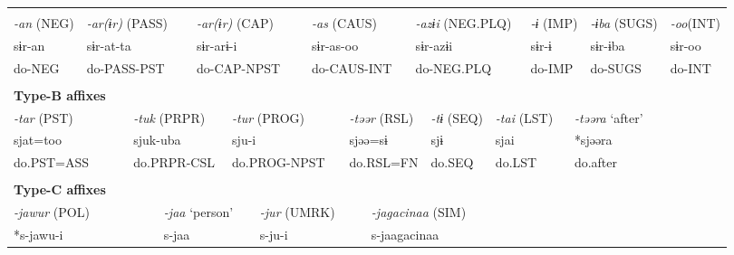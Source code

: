 \tabletail{}
\tablelasttail{}
\begin{tabularx}{\textwidth}{XXXXXXXXXXXXXXXXXXXXX}
\lsptoprule
\multicolumn{21}{X}{{\bfseries Type-A affixes}}\\
{ \textit{{}-an} (NEG)} & \multicolumn{4}{X}{{ \textit{{}-ar(ɨr)} (PASS)}} & \multicolumn{5}{X}{{ \textit{{}-ar(ɨr)} (CAP)}} & \multicolumn{4}{X}{{ \textit{{}-as} (CAUS)}} & \multicolumn{3}{X}{{ \textit{{}-azɨi} (NEG.PLQ)}} & \multicolumn{2}{X}{{ \textit{{}-ɨ} (IMP)}} & { \textit{{}-ɨba} (SUGS)} & { \textit{{}-oo}(INT)}\\
{ sɨr-an} & \multicolumn{4}{X}{{ sɨr-at-ta}} & \multicolumn{5}{X}{{ sɨr-arɨ-i}} & \multicolumn{4}{X}{{ sɨr-as-oo}} & \multicolumn{3}{X}{{ sɨr-azɨi}} & \multicolumn{2}{X}{{ sɨr-ɨ}} & { sɨr-ɨba} & { sɨr-oo}\\
do-NEG & \multicolumn{4}{X}{do-PASS-PST} & \multicolumn{5}{X}{do-CAP-NPST} & \multicolumn{4}{X}{do-CAUS-INT} & \multicolumn{3}{X}{do-NEG.PLQ} & \multicolumn{2}{X}{do-IMP} & do-SUGS & do-INT\\
\multicolumn{21}{X}{}\\
\multicolumn{21}{X}{{\bfseries Type-B affixes}}\\
\multicolumn{3}{X}{{ \textit{{}-tar} (PST)}} & \multicolumn{4}{X}{{ \textit{{}-tuk} (PRPR)}} & \multicolumn{4}{X}{{ \textit{{}-tur} (PROG)}} & \multicolumn{4}{X}{{ \textit{{}-təər} (RSL)}} & { \textit{{}-tɨ} (SEQ)} & \multicolumn{2}{X}{{ \textit{{}-tai} (LST)}} & \multicolumn{3}{X}{{ \textit{{}-təəra} ‘after’}}\\
\multicolumn{3}{X}{{ sjat=too}} & \multicolumn{4}{X}{{ sjuk-uba}} & \multicolumn{4}{X}{{ sju-i}} & \multicolumn{4}{X}{{ sjəə=sɨ}} & { sjɨ} & \multicolumn{2}{X}{{ sjai}} & \multicolumn{3}{X}{{ *sjəəra}}\\
\multicolumn{3}{X}{do.PST=ASS} & \multicolumn{4}{X}{do.PRPR-CSL} & \multicolumn{4}{X}{do.PROG-NPST} & \multicolumn{4}{X}{do.RSL=FN} & do.SEQ & \multicolumn{2}{X}{do.LST} & \multicolumn{3}{X}{{ do.after}}\\
\multicolumn{3}{X}{} & \multicolumn{4}{X}{} & \multicolumn{4}{X}{} & \multicolumn{4}{X}{} &  & \multicolumn{2}{X}{} & \multicolumn{3}{X}{}\\
\multicolumn{21}{X}{{\bfseries Type-C affixes}}\\
\multicolumn{4}{X}{{ \textit{{}-jawur} (POL)}} & \multicolumn{4}{X}{{ \textit{{}-jaa} ‘person’}} & \multicolumn{4}{X}{{ \textit{{}-jur} (UMRK)}} & \multicolumn{9}{X}{{ \textit{{}-jagacinaa} (SIM)}}\\
\multicolumn{4}{X}{{ *s-jawu-i}} & \multicolumn{4}{X}{{ s-jaa}} & \multicolumn{4}{X}{s-ju-i} & \multicolumn{9}{X}{{ s-jaagacinaa}}\\

\end{tabularx}

